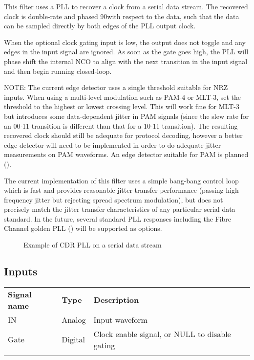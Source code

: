 This filter uses a PLL to recover a clock from a serial data stream. The recovered clock is double-rate and
phased 90\textdegree with respect to the data, such that the data can be sampled directly by both edges of the PLL
output clock.

When the optional clock gating input is low, the output does not toggle and any edges in the input signal are ignored.
As soon as the gate goes high, the PLL will phase shift the internal NCO to align with the next transition in the input
signal and then begin running closed-loop.

NOTE: The current edge detector uses a single threshold suitable for NRZ inputs. When using a multi-level modulation
such as PAM-4 or MLT-3, set the threshold to the highest or lowest crossing level. This will work fine for MLT-3 but
introduces some data-dependent jitter in PAM signals (since the slew rate for an 00-11 transition is different than
that for a 10-11 transition). The resulting recovered clock should still be adequate for protocol decoding, however a
better edge detector will need to be implemented in order to do adequate jitter measurements on PAM waveforms. An edge
detector suitable for PAM is planned ().

The current implementation of this filter uses a simple bang-bang control loop which is fast and provides reasonable
jitter transfer performance (passing high frequency jitter but rejecting spread spectrum modulation), but does not
precisely match the jitter transfer characteristics of any particular serial data standard. In the future, several
standard PLL responses including the Fibre Channel golden PLL () will be supported as options.

\begin{figure}[h]
\centering
{}
\caption{Example of CDR PLL on a serial data stream}
\label{filter_cdrpll}
\end{figure}

\subsection{Inputs}

\begin{tabularx}{16cm}{llX}
\thickhline
\textbf{Signal name} & \textbf{Type} & \textbf{Description} \\
\thickhline
IN & Analog & Input waveform \\
\thinhline
Gate & Digital & Clock enable signal, or NULL to disable gating\\
\thickhline
\end{tabularx}

